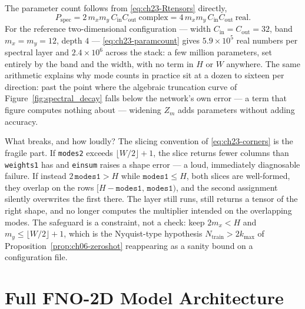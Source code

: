 The parameter count follows from \eqref{eq:ch23-Rtensors} directly,
\begin{equation}
  \label{eq:ch23-paramcount}
  P_{\text{spec}} = 2\, m_x m_y\, C_{\text{in}} C_{\text{out}} \ \text{complex} = 4\, m_x m_y\, C_{\text{in}} C_{\text{out}} \ \text{real}.
\end{equation}
For the reference two-dimensional configuration --- width
$C_{\text{in}} = C_{\text{out}} = 32$, band $m_x = m_y = 12$, depth $4$ ---
\eqref{eq:ch23-paramcount} gives $5.9 \times 10^{5}$ real numbers per spectral
layer and $2.4 \times 10^{6}$ across the stack: a few million parameters, set
entirely by the band and the width, with no term in $H$ or $W$ anywhere. The same
arithmetic explains why mode counts in practice sit at a dozen to sixteen per
direction: past the point where the algebraic truncation curve of
Figure~\ref{fig:spectral_decay} falls below the network's own error --- a term
that figure computes nothing about ---
widening $Z_m$ adds parameters without adding accuracy.

What breaks, and how loudly? The slicing convention of
\eqref{eq:ch23-corners} is the fragile part. If \texttt{modes2} exceeds
$\lfloor W/2 \rfloor + 1$, the slice returns fewer columns than
\texttt{weights1} has and \texttt{einsum} raises a shape error --- a loud,
immediately diagnosable failure. If instead $2\,\texttt{modes1} > H$ while
$\texttt{modes1} \le H$, both slices are well-formed, they overlap on the rows
$[H - \texttt{modes1},\, \texttt{modes1})$, and the second assignment silently
overwrites the first there. The layer still runs, still returns a tensor of the
right shape, and no longer computes the multiplier intended on the overlapping
modes. The safeguard is a constraint, not a check: keep $2m_x < H$ and
$m_y \le \lfloor W/2 \rfloor + 1$, which is the Nyquist-type hypothesis
$N_{\text{train}} > 2k_{\max}$ of Proposition~\ref{prop:ch06-zeroshot}
reappearing as a sanity bound on a configuration file.

\section{Full FNO-2D Model Architecture}
\label{sec:ch23-fno2d}

